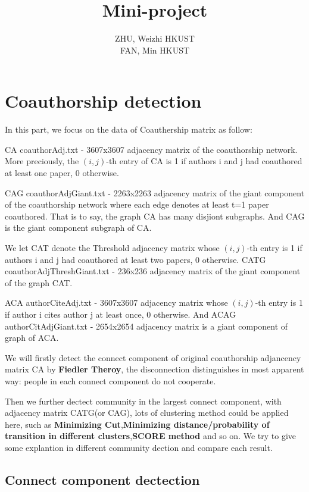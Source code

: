 \documentclass{article}
\numberwithin{equation}{section}
\begin{document}
\title{Mini-project}

\author{ZHU, Weizhi \; HKUST\\
FAN, Min \; HKUST}
\maketitle
\section{Coauthorship detection}
  In this part, we focus on the data of Coauthership matrix as follow:

CA coauthorAdj.txt - 3607x3607 adjacency matrix of the coauthorship network. More preciously, the $(i,j)$-th entry of CA is 1 if authors i and j had coauthored at least one paper, 0 otherwise.

CAG coauthorAdjGiant.txt - 2263x2263 adjacency matrix of the giant component of the coauthorship network where each edge denotes at least t=1 paper coauthored. That is to say, the graph CA has many disjiont subgraphs. And CAG is the giant component subgraph of CA.

We let CAT denote the Threshold adjacency matrix whose $(i,j)$-th entry is 1 if authors i and j had coauthored at least two papers, 0 otherwise.
CATG coauthorAdjThreshGiant.txt -  236x236 adjacency matrix of the giant component of the graph CAT.

ACA authorCiteAdj.txt - 3607x3607 adjacency matrix whose $(i,j)$-th entry is 1 if author i cites author j at least once, 0 otherwise. And ACAG authorCitAdjGiant.txt - 2654x2654 adjacency matrix is a giant component of graph of ACA.

We will firstly detect the connect component of original coauthorship adjancency matrix CA by \textbf{Fiedler Theroy}, the disconnection distinguishes in most apparent way: people in each connect component do not cooperate.

Then we further dectect community in the largest connect component, with adjacency matrix CATG(or CAG), lots of clustering method could be applied here, such as \textbf{Minimizing Cut},\textbf{Minimizing distance/probability of transition in different clusters},\textbf{SCORE method} and so on. We try to give some explantion in different community dection and compare each result.


\subsection{Connect component dectection}
\end{document}
